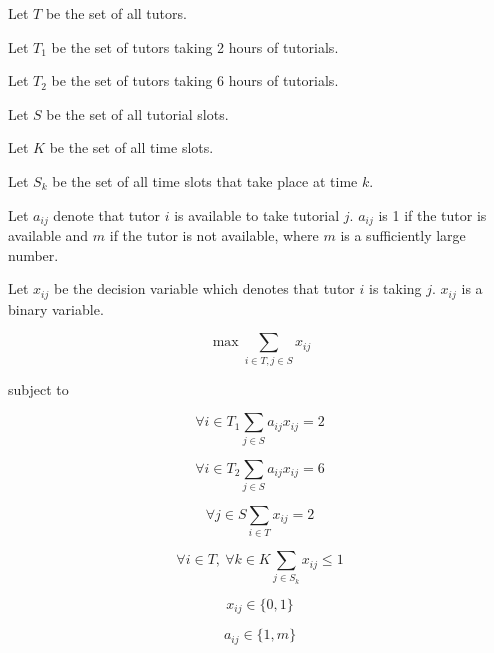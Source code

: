 \documentclass{article}
\begin{document}
Let $T$ be the set of all tutors.

Let $T_1$ be the set of tutors taking 2 hours of tutorials.

Let $T_2$ be the set of tutors taking 6 hours of tutorials.

Let $S$ be the set of all tutorial slots.

Let $K$ be the set of all time slots.

Let $S_k$ be the set of all time slots that take place at time $k$.

Let $a_{ij}$ denote that tutor $i$ is available to take tutorial $j$. $a_{ij}$ is 1 if the tutor is available and $m$ if the tutor is not available, where $m$ is a sufficiently large number.

Let $x_{ij}$ be the decision variable which denotes that tutor $i$ is taking $j$. $x_{ij}$ is a binary variable.

$$ \max \sum_{i \in T, j \in S} x_{ij} $$

subject to 

$$ \forall i \in T_1 \sum_{j \in S} a_{ij}x_{ij} = 2$$

$$ \forall i \in T_2 \sum_{j \in S} a_{ij}x_{ij} = 6$$

$$ \forall j \in S \sum_{i \in T} x_{ij} = 2$$

$$ \forall i \in T , \: \forall k \in K \sum_{j \in S_{k}} x_{ij} \leq 1$$

$$ x_{ij} \in \{0,1\}$$

$$ a_{ij} \in \{1,m\}$$
\end{document}
